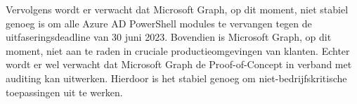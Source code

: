 Vervolgens wordt er verwacht dat Microsoft Graph, op dit moment, niet stabiel genoeg is om alle Azure AD PowerShell modules te vervangen tegen de uitfaseringsdeadline van 30 juni 2023. Bovendien is Microsoft Graph, op dit moment, niet aan te raden in cruciale productieomgevingen van klanten. Echter wordt er wel verwacht dat Microsoft Graph de Proof-of-Concept in verband met auditing kan uitwerken. Hierdoor is het stabiel genoeg om niet-bedrijfskritische toepassingen uit te werken.


